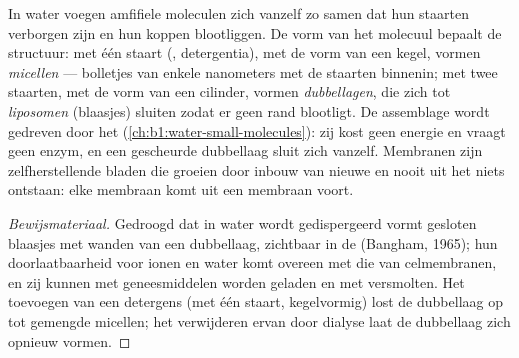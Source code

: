 \begin{proposition}[Zelfassemblage]\label{prop:b1:lipids:selfassembly}
In water voegen amfifiele moleculen zich vanzelf zo samen dat hun staarten
verborgen zijn en hun koppen blootliggen. De vorm van het molecuul bepaalt de
structuur:  met één staart (, detergentia), met de vorm van een
kegel, vormen \emph{micellen} --- bolletjes van enkele nanometers met de staarten
binnenin;  met twee staarten, met de vorm van een cilinder, vormen
\emph{dubbellagen}, die zich tot \emph{liposomen} (blaasjes) sluiten zodat er geen
rand blootligt. De assemblage wordt gedreven door het 
(\cref{ch:b1:water-small-molecules}): zij kost geen energie en vraagt geen enzym,
en een gescheurde dubbellaag sluit zich vanzelf. Membranen zijn zelfherstellende
bladen die groeien door inbouw van nieuwe  en nooit uit het niets ontstaan:
elke membraan komt uit een membraan voort.
\end{proposition}
\begin{proof}[Bewijsmateriaal]
Gedroogd  dat in water wordt gedispergeerd vormt gesloten blaasjes met
wanden van een dubbellaag, zichtbaar in de  (Bangham, 1965);
hun doorlaatbaarheid voor ionen en water komt overeen met die van celmembranen, en
zij kunnen met geneesmiddelen worden geladen en met  versmolten. Het
toevoegen van een detergens (met één staart, kegelvormig) lost de dubbellaag op
tot gemengde micellen; het verwijderen ervan door dialyse laat de dubbellaag zich
opnieuw vormen.
\end{proof}

